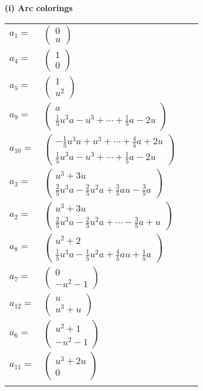 \documentclass[1p]{elsarticle_modified}
\theoremstyle{definition}
\begin{document}
\flushleft \textbf{(i) Arc colorings}\\
\begin{tabular}{m{7pt} m{180pt} m{7pt} m{180pt} }
\flushright $a_{1}=$&$\begin{pmatrix}0\\u\end{pmatrix}$ \\
\flushright $a_{4}=$&$\begin{pmatrix}1\\0\end{pmatrix}$ \\
\flushright $a_{5}=$&$\begin{pmatrix}1\\u^2\end{pmatrix}$ \\
\flushright $a_{9}=$&$\begin{pmatrix}a\\\frac{1}{5} u^3 a- u^3+\cdots+\frac{1}{5} a-2 u\end{pmatrix}$ \\
\flushright $a_{10}=$&$\begin{pmatrix}-\frac{1}{5} u^3 a+u^3+\cdots+\frac{4}{5} a+2 u\\\frac{1}{5} u^3 a- u^3+\cdots+\frac{1}{5} a-2 u\end{pmatrix}$ \\
\flushright $a_{3}=$&$\begin{pmatrix}u^3+3 u\\\frac{2}{5} u^3 a-\frac{2}{5} u^2 a+\frac{3}{5} a u-\frac{3}{5} a\end{pmatrix}$ \\
\flushright $a_{2}=$&$\begin{pmatrix}u^3+3 u\\\frac{2}{5} u^3 a-\frac{2}{5} u^2 a+\cdots-\frac{3}{5} a+u\end{pmatrix}$ \\
\flushright $a_{8}=$&$\begin{pmatrix}u^2+2\\\frac{1}{5} u^3 a-\frac{1}{5} u^2 a+\frac{4}{5} a u+\frac{1}{5} a\end{pmatrix}$ \\
\flushright $a_{7}=$&$\begin{pmatrix}0\\- u^2-1\end{pmatrix}$ \\
\flushright $a_{12}=$&$\begin{pmatrix}u\\u^3+u\end{pmatrix}$ \\
\flushright $a_{6}=$&$\begin{pmatrix}u^2+1\\- u^2-1\end{pmatrix}$ \\
\flushright $a_{11}=$&$\begin{pmatrix}u^3+2 u\\0\end{pmatrix}$\\&\end{tabular}
\end{document}
